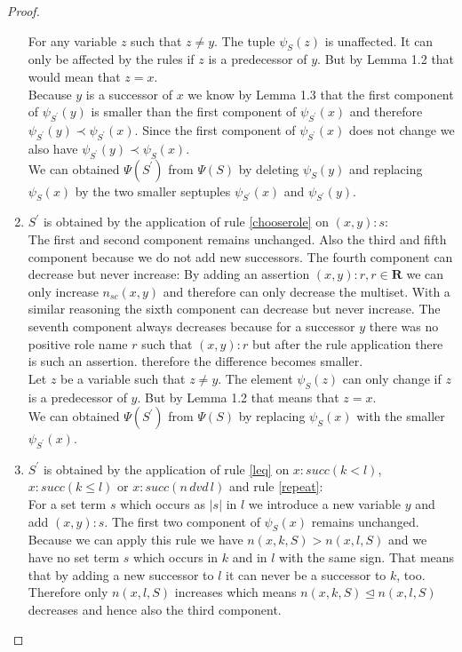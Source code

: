 \documentclass[a4paper,11pt]{scrartcl}
\theoremstyle{break}
\theoremstyle{definition}
\begin{document}
\begin{proof}
\begin{enumerate}
For any variable $z$ such that $z\neq y$. The tuple $\psi_S(z)$ is unaffected. It can only be affected by the rules if $z$ is a predecessor of $y$. But by Lemma 1.2 that would mean that $z=x$.\\
Because $y$ is a successor of $x$ we know by Lemma 1.3 that the first component of $\psi_{S^\prime}(y)$ is smaller than the first component of $\psi_{S^\prime}(x)$ and therefore $\psi_{S^\prime}(y)\prec\psi_{S^\prime}(x)$. Since the first component of $\psi_{S^\prime}(x)$ does not change we also have $\psi_{S^\prime}(y)\prec\psi_{S}(x)$.\\
We can obtained $\Psi(S^\prime)$ from $\Psi(S)$ by deleting $\psi_S(y)$ and replacing $\psi_S(x)$ by the two smaller septuples $\psi_{S^\prime}(x)$ and $\psi_{S^\prime}(y)$.
\item $S^\prime$ is obtained by the application of rule \ref{chooserole} on $(x,y):s$:\\
The first and second component remains unchanged. Also the third and fifth component because we do not add new successors. The fourth component can decrease but never increase: By adding an assertion $(x,y):r, r\in\mathbf{R}$ we can only increase $n_{sc}(x,y)$ and therefore can only decrease the multiset. With a similar reasoning the sixth component can decrease but never increase. The seventh component always decreases because for a successor $y$ there was no positive role name $r$ such that $(x,y):r$ but after the rule application there is such an assertion. therefore the difference becomes smaller.\\
Let $z$ be a variable such that $z\neq y$. The element $\psi_S(z)$ can only change if $z$ is a predecessor of $y$. But by Lemma 1.2 that means that $z=x$.\\
We can obtained $\Psi(S^\prime)$ from $\Psi(S)$ by replacing $\psi_S(x)$ with the smaller $\psi_{S^\prime}(x)$.
\item $S^\prime$ is obtained by the application of rule \ref{leq} on $x:succ(k<l)$, $x:succ(k\leq l)$ or $x:succ(n\,dvd\,l)$ and rule \ref{repeat}:\\ 
For a set term $s$ which occurs as $|s|$ in $l$ we introduce a new variable $y$ and add $(x,y):s$. The first two component of $\psi_S(x)$ remains unchanged. Because we can apply this rule we have $n(x,k,S)>n(x,l,S)$ and we have no set term $s$ which occurs in $k$ and in $l$ with the same sign. That means that by adding a new successor to $l$ it can never be a successor to $k$, too. Therefore only $n(x,l,S)$ increases which means $n(x,k,S)\unlhd n(x,l,S)$ decreases and hence also the third component.\\

\end{enumerate}
\end{proof}
\end{document}
